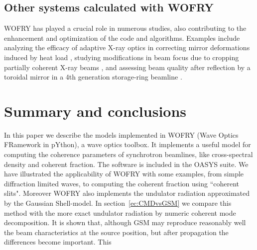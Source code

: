 \documentclass{iopconfser}
\newcommand{\todo}[1]{{\color{red}[TODO: "#1'']}}
\begin{document}



\subsection{Other systems calculated with WOFRY}

WOFRY has played a crucial role in numerous studies, also contributing to the enhancement and optimization of the code and algorithms. Examples include analyzing the efficacy of adaptive X-ray optics in correcting mirror deformations induced by heat load \citep{SanchezdelRio2020}, studying modifications in beam focus due to cropping partially coherent X-ray beams \citep{SanchezdelRio2022EPL}, and assessing beam quality after reflection by a toroidal mirror in a 4th generation storage-ring beamline \citep{ReyesHerrera2023}.

\section{Summary and conclusions}
\label{sec:summary}
In this paper we describe the models implemented in WOFRY (Wave Optics FRamework in pYthon), a wave optics toolbox. It implements a useful model for computing the coherence parameters of synchrotron beamlines, like cross-spectral density and coherent fraction. The software is included in the OASYS \citep{OASYS} suite. We have illustrated the applicability of WOFRY with some examples, from simple diffraction limited waves, to computing the coherent fraction using ``coherent slits". Moreover WOFRY also implements the undulator radiation approximated by the Gaussian Shell-model. In section~\ref{ec:CMDvsGSM} we compare this method with the more exact undulator radiation by numeric coherent mode decomposition. It is shown that, although GSM may reproduce reasonably well the beam characteristics at the source position, but after propagation the differences become important. This 










%

\end{document}
